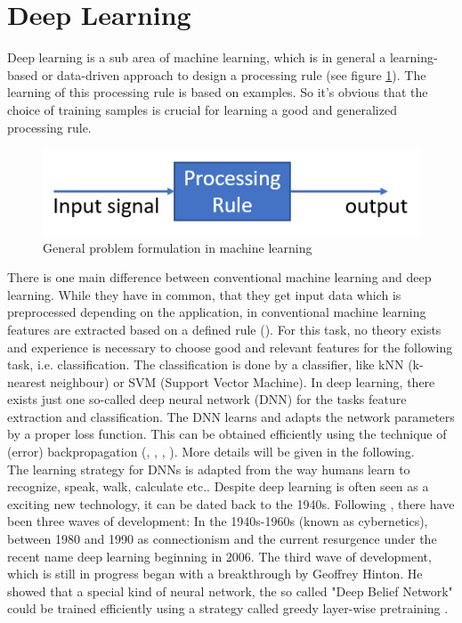 \documentclass[12pt,DIV14,BCOR12mm,a4paper,footexclude,headinclude,halfparskip-,twoside,openright,openany,cleardoubleempty,idxtotoc,bibtotoc]{scrreprt} %
\numberwithin{equation}{chapter}
\begin{document}
\section{Deep Learning}
Deep learning is a sub area of machine learning, which is in general a learning-based or data-driven approach to design a processing rule (see figure \ref{fig:ProcessingRule}). The learning of this processing rule is based on examples. So it's obvious that the choice of training samples is crucial for learning a good and generalized processing rule. 
\begin{figure}[htb!]
	\centering
	\includegraphics[width=0.5\linewidth]{Graphiken/ProcessingRule}
	\caption{General problem formulation in machine learning}
	\label{fig:ProcessingRule}
\end{figure}
There is one main difference between conventional machine learning and deep learning. While they have in common, that they get input data which is preprocessed depending on the application, in conventional machine learning features are extracted based on a defined rule (\cite{Goodfellow-et-al-2016}). For this task, no theory exists and experience is necessary to choose good and relevant features for the following task, i.e. classification. The classification is done by a classifier, like kNN (k-nearest neighbour) or SVM (Support Vector Machine). In deep learning, there exists just one so-called deep neural network (DNN) for the tasks feature extraction and classification. The DNN learns and adapts the network parameters by a proper loss function. This can be obtained efficiently using the technique of (error) backpropagation (\cite{Goodfellow-et-al-2016}, \cite{Nielsen-Michael}, \cite{DeepLearningDive}, \cite{Bishop}). More details will be given in the following.\\
The learning strategy for DNNs is adapted from the way humans learn to recognize, speak, walk, calculate etc.. Despite deep learning is often seen as a exciting new technology, it can be dated back to the 1940s. Following \cite{Goodfellow-et-al-2016}, there have been three waves of development: In the 1940s-1960s (known as cybernetics), between 1980 and 1990 as connectionism and the current resurgence under the recent name deep learning beginning in 2006. The third wave of development, which is still in progress began with a breakthrough by Geoffrey Hinton. He showed that a special kind of neural network, the so called "Deep Belief Network" could be trained efficiently using a strategy called greedy layer-wise pretraining \cite{Hinton-et-al-2006}.\\
\end{document}
